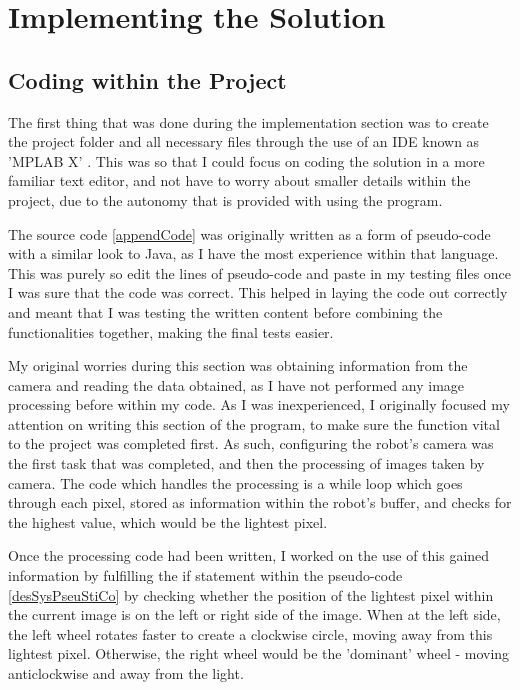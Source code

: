 \section{Implementing the Solution}
\subsection{Coding within the Project} \label{realCoding}
The first thing that was done during the implementation section was to create
the project folder and all necessary files through the use of an IDE known as
'MPLAB X' \cite{mpLabXsite}.  This was so that I could focus on coding the
solution in a more familiar text editor, and not have to worry about smaller
details within the project, due to the autonomy that is provided with using the
program.

The source code \ref{appendCode} was originally written as a form of
pseudo-code with a similar look to Java, as I have the most experience within
that language.  This was purely so edit the lines of pseudo-code and paste in
my testing files once I was sure that the code was correct.  This helped in
laying the code out correctly and meant that I was testing the written content
before combining the functionalities together, making the final tests easier.

My original worries during this section was obtaining information from the
camera and reading the data obtained, as I have not performed any image
processing before within my code.  As I was inexperienced, I originally focused
my attention on writing this section of the program, to make sure the function 
vital to the project was completed first.  As such, configuring the robot's
camera was the first task that was completed, and then the processing of images
taken by camera.  The code which handles the processing is a while loop which
goes through each pixel, stored as information within the robot's buffer, and
checks for the highest value, which would be the lightest pixel.

Once the processing code had been written, I worked on the use of this gained
information by fulfilling the if statement within the pseudo-code
\ref{desSysPseuStiCo} by checking whether the position of the lightest pixel
within the current image is on the left or right side of the image.  When at
the left side, the left wheel rotates faster to create a clockwise circle,
moving away from this lightest pixel.  Otherwise, the right wheel would be the
'dominant' wheel - moving anticlockwise and away from the light.

